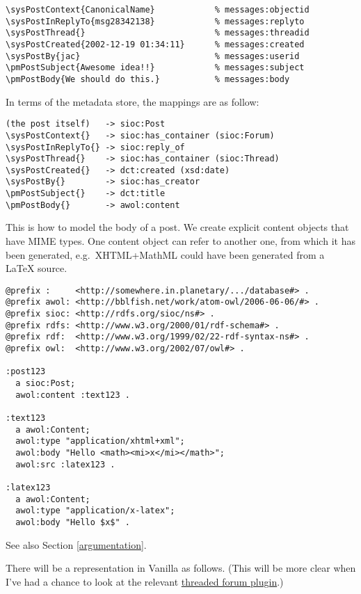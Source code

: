 \documentclass{article}
\begin{document}
\begin{verbatim}
\sysPostContext{CanonicalName}            % messages:objectid
\sysPostInReplyTo{msg28342138}            % messages:replyto
\sysPostThread{}                          % messages:threadid
\sysPostCreated{2002-12-19 01:34:11}      % messages:created
\sysPostBy{jac}                           % messages:userid
\pmPostSubject{Awesome idea!!}            % messages:subject
\pmPostBody{We should do this.}           % messages:body
\end{verbatim}

In terms of the metadata store, the mappings are as
follow:

\begin{verbatim}
(the post itself)   -> sioc:Post
\sysPostContext{}   -> sioc:has_container (sioc:Forum)
\sysPostInReplyTo{} -> sioc:reply_of
\sysPostThread{}    -> sioc:has_container (sioc:Thread)
\sysPostCreated{}   -> dct:created (xsd:date)
\sysPostBy{}        -> sioc:has_creator
\pmPostSubject{}    -> dct:title
\pmPostBody{}       -> awol:content
\end{verbatim}

This is how to model the body of a post.  We create explicit content objects that have MIME types.  One content object can refer to another one, from which it has been generated, e.g.\ XHTML+MathML could have been generated from a {\LaTeX} source.

\begin{verbatim}
@prefix :     <http://somewhere.in.planetary/.../database#> .
@prefix awol: <http://bblfish.net/work/atom-owl/2006-06-06/#> .
@prefix sioc: <http://rdfs.org/sioc/ns#> .
@prefix rdfs: <http://www.w3.org/2000/01/rdf-schema#> .
@prefix rdf:  <http://www.w3.org/1999/02/22-rdf-syntax-ns#> .
@prefix owl:  <http://www.w3.org/2002/07/owl#> .

:post123
  a sioc:Post;
  awol:content :text123 .

:text123
  a awol:Content;
  awol:type "application/xhtml+xml";
  awol:body "Hello <math><mi>x</mi></math>";
  awol:src :latex123 .

:latex123
  a awol:Content;
  awol:type "application/x-latex";
  awol:body "Hello $x$" .
\end{verbatim}

See also Section \ref{argumentation}.

There will be a representation in Vanilla as follows.
(This will be more clear when I've had a chance to look at
the relevant
\href{http://vanillaforums.org/addon/replyto-plugin}{threaded
  forum plugin}.)
\end{document}
